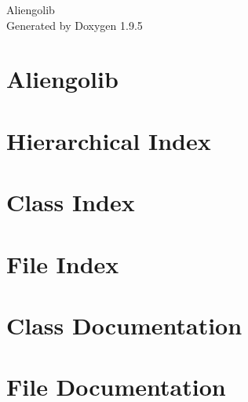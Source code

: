 \documentclass[twoside]{book}
\newcommand{\+}{\discretionary{\mbox{\scriptsize$\hookleftarrow$}}{}{}}
\newcommand{\clearemptydoublepage}{%
    \newpage{\pagestyle{empty}\cleardoublepage}%
  }
\begin{document}
  \raggedbottom
    \hypersetup{pageanchor=false,
                bookmarksnumbered=true,
                pdfencoding=unicode
               }
  \begin{titlepage}
  \vspace*{7cm}
  \begin{center}%
  {\Large Aliengolib}\\
  \vspace*{1cm}
  {\large Generated by Doxygen 1.9.5}\\
  \end{center}
  \end{titlepage}
  \clearemptydoublepage
  \tableofcontents
  \clearemptydoublepage
  \hypersetup{pageanchor=true}
\chapter{Aliengolib}
\label{md__home_marcom_lenovo_dls_ws_home_ant_robotlib_ws_src_dls_distro_robots_aliengo_commons_aliengolib_README}

\chapter{Hierarchical Index}

\chapter{Class Index}

\chapter{File Index}

\chapter{Class Documentation}


\chapter{File Documentation}



  \backmatter
  \newpage
  \clearemptydoublepage
  \printindex
\end{document}
